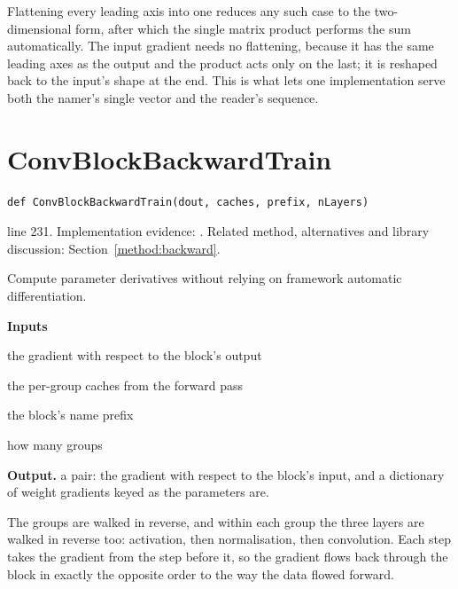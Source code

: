 Flattening every leading axis into one reduces any such case to the two-dimensional form, after which the single matrix product performs the sum automatically. The input gradient needs no flattening, because it has the same leading axes as the output and the product acts only on the last; it is reshaped back to the input's shape at the end. This is what lets one implementation serve both the namer's single vector and the reader's sequence.



\section{ConvBlockBackwardTrain}\label{fn:train:ConvBlockBackwardTrain}
\begin{lstlisting}[style=sig]
def ConvBlockBackwardTrain(dout, caches, prefix, nLayers)
\end{lstlisting}
 line 231. Implementation evidence: \cite{code2026}. Related method, alternatives and library discussion: Section~\ref{method:backward}.


Compute parameter derivatives without relying on framework automatic differentiation.




\noindent\textbf{Inputs}
\begin{description}[leftmargin=2.2em,style=nextline,font=\normalfont\ttfamily]\setlength\itemsep{1pt}
  \item[{dout}] \normalfont the gradient with respect to the block's output
  \item[{caches}] \normalfont the per-group caches from the forward pass
  \item[{prefix}] \normalfont the block's name prefix
  \item[{nLayers}] \normalfont how many groups
\end{description}

\noindent\textbf{Output.} a pair: the gradient with respect to the block's input, and a dictionary of weight gradients keyed as the parameters are.


The groups are walked in reverse, and within each group the three layers are walked in reverse too: activation, then normalisation, then convolution. Each step takes the gradient from the step before it, so the gradient flows back through the block in exactly the opposite order to the way the data flowed forward.


